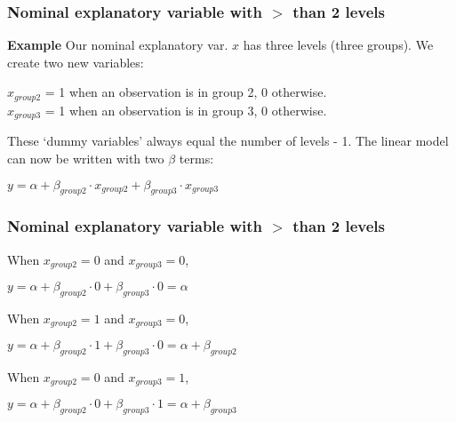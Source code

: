 \documentclass{beamer}
\begin{document}
\begin{frame}
  \frametitle{Nominal explanatory variable with $>$ than 2 levels}
  \begin{block}{\textbf{Example}}
    Our nominal explanatory var. $x$ has three levels (three groups). We create two new variables:\\ \vspace{0.5cm}
    \begin{centering}
      $x_{group2}$ = 1 when an observation is in group 2, 0 otherwise.\\ \vspace{0.5cm}
      $x_{group3}$ = 1 when an observation is in group 3, 0 otherwise.\\ \vspace{0.5cm}
    \end{centering}
    These `dummy variables' always equal the number of levels - 1. The linear model can now be written with two $\beta$ terms:\\ \vspace{0.5cm}
    \begin{centering}
      $y = \alpha + \beta_{group2} \cdot x_{group2} + \beta_{group3} \cdot x_{group3}$\\
    \end{centering}
\end{block}
\end{frame}
\begin{frame}
  \frametitle{Nominal explanatory variable with $>$ than 2 levels}
  \begin{block}{\textbf{}}
    When $x_{group2} = 0$ and $x_{group3} = 0$, \\ \vspace{0.5cm}
  \begin{centering}
    $y = \alpha + \beta_{group2} \cdot 0 + \beta_{group3} \cdot 0 = \alpha$ \\
\end{centering} \vspace{0.5cm}
  When $x_{group2} = 1$ and $x_{group3} = 0$, \\ \vspace{0.5cm}
\begin{centering}
  $y = \alpha + \beta_{group2} \cdot 1 + \beta_{group3} \cdot 0 = \alpha + \beta_{group2}$ \\
\end{centering} \vspace{0.5cm}
  When $x_{group2} = 0$ and $x_{group3} = 1$, \\ \vspace{0.5cm}
\begin{centering}
  $y = \alpha + \beta_{group2} \cdot 0 + \beta_{group3} \cdot 1 = \alpha + \beta_{group3}$ \\
  \end{centering}
\end{block}
\end{frame}%
\end{document}
